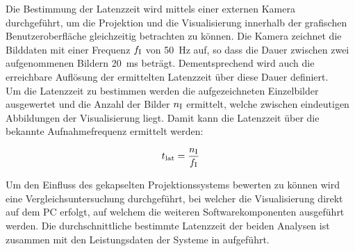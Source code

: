 \prever{
}

Die Bestimmung der Latenzzeit wird mittels einer externen Kamera durchgeführt, um die Projektion und die Visualisierung innerhalb der grafischen Benutzeroberfläche gleichzeitig betrachten zu können. Die Kamera zeichnet die Bilddaten mit einer Frequenz $f_{\mathrm{I}}$ von \SI{50}{\Hz} auf, so dass die Dauer zwischen zwei aufgenommenen Bildern \SI{20}{\milli\second} beträgt. Dementsprechend wird auch die erreichbare Auflösung der ermittelten Latenzzeit über diese Dauer definiert.\\
Um die Latenzzeit zu bestimmen werden die aufgezeichneten Einzelbilder ausgewertet und die Anzahl der Bilder $n_{\mathrm{I}}$ ermittelt, welche zwischen eindeutigen Abbildungen der Visualisierung liegt. Damit kann die Latenzzeit über die bekannte Aufnahmefrequenz ermittelt werden:

\begin{equation}
t_{\mathrm{lat}} = \frac{n_{\mathrm{I}}}{f_{\mathrm{I}}}
\end{equation}


Um den Einfluss des gekapselten Projektionssystems bewerten zu können wird eine Vergleichsuntersuchung durchgeführt, bei welcher die Visualisierung direkt auf dem PC erfolgt, auf welchem die weiteren Softwarekomponenten ausgeführt werden. Die durchschnittliche bestimmte Latenzzeit der beiden Analysen ist zusammen mit den Leistungsdaten der Systeme in  aufgeführt.

\prever{
}


